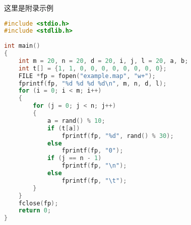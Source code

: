 \begin{Appendix}

    这里是附录示例

    
    
    \begin{lstlisting}[language=C]
#include <stdio.h>
#include <stdlib.h>
        
int main()
{
    int m = 20, n = 20, d = 20, i, j, l = 20, a, b;
    int t[] = {1, 1, 0, 0, 0, 0, 0, 0, 0, 0};
    FILE *fp = fopen("example.map", "w+");
    fprintf(fp, "%d %d %d %d\n", m, n, d, l);
    for (i = 0; i < m; i++)
    {
        for (j = 0; j < n; j++)
        {
            a = rand() % 10;
            if (t[a])
                fprintf(fp, "%d", rand() % 30);
            else
                fprintf(fp, "0");
            if (j == n - 1)
                fprintf(fp, "\n");
            else
                fprintf(fp, "\t");
        }
    }
    fclose(fp);
    return 0;
}
    \end{lstlisting}

\end{Appendix}